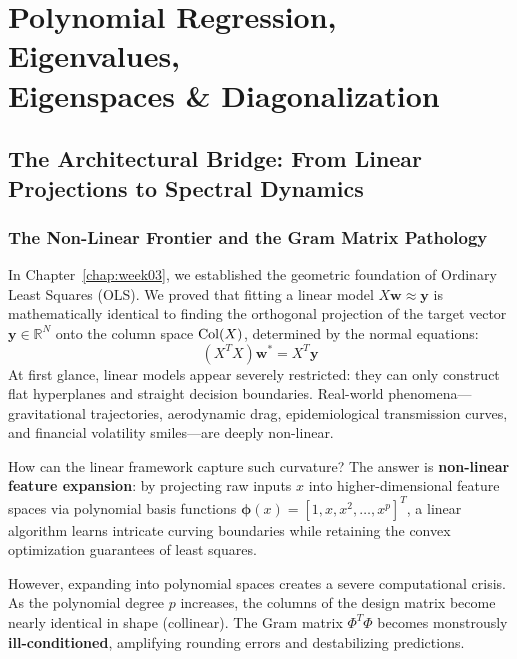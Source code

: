 \chapter[Eigenvalues \& Diagonalization]{Polynomial Regression, Eigenvalues,\\Eigenspaces \& Diagonalization}
\label{chap:week04}

\section{The Architectural Bridge: From Linear Projections to Spectral Dynamics}

\subsection{The Non-Linear Frontier and the Gram Matrix Pathology}
In Chapter~\ref{chap:week03}, we established the geometric foundation of Ordinary Least Squares (OLS). We proved that fitting a linear model $X\mathbf{w} \approx \mathbf{y}$ is mathematically identical to finding the orthogonal projection of the target vector $\mathbf{y} \in \mathbb{R}^N$ onto the column space $\operatorname{Col}(X)$, determined by the normal equations:
\begin{equation}
(X^T X)\mathbf{w}^* = X^T \mathbf{y}
\end{equation}
At first glance, linear models appear severely restricted: they can only construct flat hyperplanes and straight decision boundaries. Real-world phenomena—gravitational trajectories, aerodynamic drag, epidemiological transmission curves, and financial volatility smiles—are deeply non-linear. 

How can the linear framework capture such curvature? The answer is \textbf{non-linear feature expansion}: by projecting raw inputs $x$ into higher-dimensional feature spaces via polynomial basis functions $\boldsymbol{\phi}(x) = [1, x, x^2, \dots, x^p]^T$, a linear algorithm learns intricate curving boundaries while retaining the convex optimization guarantees of least squares.

However, expanding into polynomial spaces creates a severe computational crisis. As the polynomial degree $p$ increases, the columns of the design matrix become nearly identical in shape (collinear). The Gram matrix $\Phi^T \Phi$ becomes monstrously \textbf{ill-conditioned}, amplifying rounding errors and destabilizing predictions. 

